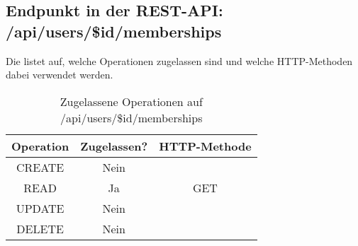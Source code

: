 \subsection{Endpunkt in der REST-API: /api/users/\$id/memberships}
Die  listet auf, welche Operationen zugelassen sind und welche HTTP-Methoden dabei verwendet werden. 

\begin{table}[!htbp]
	\begin{tabular}{|c|c|c|}
		\hline
			\textbf{Operation} & \textbf{Zugelassen?} & \textbf{HTTP-Methode} \\ \hline
			CREATE & Nein &  \\ \hline 
			READ & Ja & GET \\ \hline
			UPDATE & Nein & \\ \hline 
			DELETE & Nein & \\ \hline
	\end{tabular}

		\caption{Zugelassene Operationen auf /api/users/\$id/memberships}
		\label{tab:rest:api:users:id:memberships:meth}
\end{table}

